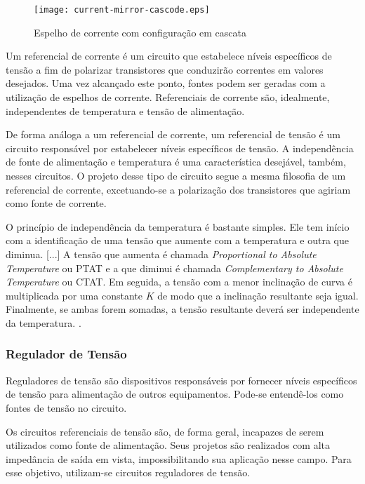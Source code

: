 \begin{figure}[!htb]
	\caption{\label{fig:current_mirror_cascode}Espelho de corrente com configuração em cascata}
	\begin{center}
		\texttt{[image: current-mirror-cascode.eps]}
	\end{center}
\end{figure}

Um referencial de corrente é um circuito que estabelece níveis específicos de tensão a fim de polarizar transistores que conduzirão correntes em valores desejados. Uma vez alcançado este ponto, fontes podem ser geradas com a utilização de espelhos de corrente. Referenciais de corrente são, idealmente, independentes de temperatura e tensão de alimentação.

De forma análoga a um referencial de corrente, um referencial de tensão é um circuito responsável por estabelecer níveis específicos de tensão. A independência de fonte de alimentação e temperatura é uma característica desejável, também, nesses circuitos. O projeto desse tipo de circuito segue a mesma filosofia de um referencial de corrente, excetuando-se a polarização dos transistores que agiriam como fonte de corrente.

\begin{citacao}
	O princípio de independência da temperatura é bastante simples. Ele tem início com a identificação de uma tensão que aumente com a temperatura e outra que diminua. [...] A tensão que aumenta é chamada \textit{Proportional to Absolute Temperature} ou PTAT e a que diminui é chamada \textit{Complementary to Absolute Temperature} ou CTAT. Em seguida, a tensão com a menor inclinação de curva é multiplicada por uma constante $K$ de modo que a inclinação resultante seja igual. Finalmente, se ambas forem somadas, a tensão resultante deverá ser independente da temperatura. \cite{ALLEN:2002}.
\end{citacao}


\subsubsection{Regulador de Tensão}
Reguladores de tensão são dispositivos responsáveis por fornecer níveis específicos de tensão para alimentação de outros equipamentos. Pode-se entendê-los como fontes de tensão no circuito.

Os circuitos referenciais de tensão são, de forma geral, incapazes de serem utilizados como fonte de alimentação. Seus projetos são realizados com alta impedância de saída em vista, impossibilitando sua aplicação nesse campo. Para esse objetivo, utilizam-se circuitos reguladores de tensão.


